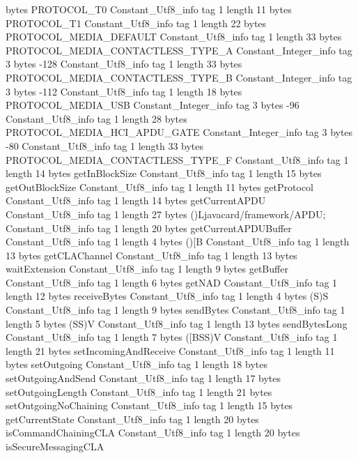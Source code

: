 {{{			bytes	PROTOCOL_T0
		}
		Constant_Utf8_info {
			tag	1
			length	11
			bytes	PROTOCOL_T1
		}
		Constant_Utf8_info {
			tag	1
			length	22
			bytes	PROTOCOL_MEDIA_DEFAULT
		}
		Constant_Utf8_info {
			tag	1
			length	33
			bytes	PROTOCOL_MEDIA_CONTACTLESS_TYPE_A
		}
		Constant_Integer_info {
			tag	3
			bytes	-128
		}
		Constant_Utf8_info {
			tag	1
			length	33
			bytes	PROTOCOL_MEDIA_CONTACTLESS_TYPE_B
		}
		Constant_Integer_info {
			tag	3
			bytes	-112
		}
		Constant_Utf8_info {
			tag	1
			length	18
			bytes	PROTOCOL_MEDIA_USB
		}
		Constant_Integer_info {
			tag	3
			bytes	-96
		}
		Constant_Utf8_info {
			tag	1
			length	28
			bytes	PROTOCOL_MEDIA_HCI_APDU_GATE
		}
		Constant_Integer_info {
			tag	3
			bytes	-80
		}
		Constant_Utf8_info {
			tag	1
			length	33
			bytes	PROTOCOL_MEDIA_CONTACTLESS_TYPE_F
		}
		Constant_Utf8_info {
			tag	1
			length	14
			bytes	getInBlockSize
		}
		Constant_Utf8_info {
			tag	1
			length	15
			bytes	getOutBlockSize
		}
		Constant_Utf8_info {
			tag	1
			length	11
			bytes	getProtocol
		}
		Constant_Utf8_info {
			tag	1
			length	14
			bytes	getCurrentAPDU
		}
		Constant_Utf8_info {
			tag	1
			length	27
			bytes	()Ljavacard/framework/APDU;
		}
		Constant_Utf8_info {
			tag	1
			length	20
			bytes	getCurrentAPDUBuffer
		}
		Constant_Utf8_info {
			tag	1
			length	4
			bytes	()[B
		}
		Constant_Utf8_info {
			tag	1
			length	13
			bytes	getCLAChannel
		}
		Constant_Utf8_info {
			tag	1
			length	13
			bytes	waitExtension
		}
		Constant_Utf8_info {
			tag	1
			length	9
			bytes	getBuffer
		}
		Constant_Utf8_info {
			tag	1
			length	6
			bytes	getNAD
		}
		Constant_Utf8_info {
			tag	1
			length	12
			bytes	receiveBytes
		}
		Constant_Utf8_info {
			tag	1
			length	4
			bytes	(S)S
		}
		Constant_Utf8_info {
			tag	1
			length	9
			bytes	sendBytes
		}
		Constant_Utf8_info {
			tag	1
			length	5
			bytes	(SS)V
		}
		Constant_Utf8_info {
			tag	1
			length	13
			bytes	sendBytesLong
		}
		Constant_Utf8_info {
			tag	1
			length	7
			bytes	([BSS)V
		}
		Constant_Utf8_info {
			tag	1
			length	21
			bytes	setIncomingAndReceive
		}
		Constant_Utf8_info {
			tag	1
			length	11
			bytes	setOutgoing
		}
		Constant_Utf8_info {
			tag	1
			length	18
			bytes	setOutgoingAndSend
		}
		Constant_Utf8_info {
			tag	1
			length	17
			bytes	setOutgoingLength
		}
		Constant_Utf8_info {
			tag	1
			length	21
			bytes	setOutgoingNoChaining
		}
		Constant_Utf8_info {
			tag	1
			length	15
			bytes	getCurrentState
		}
		Constant_Utf8_info {
			tag	1
			length	20
			bytes	isCommandChainingCLA
		}
		Constant_Utf8_info {
			tag	1
			length	20
			bytes	isSecureMessagingCLA
}}}
